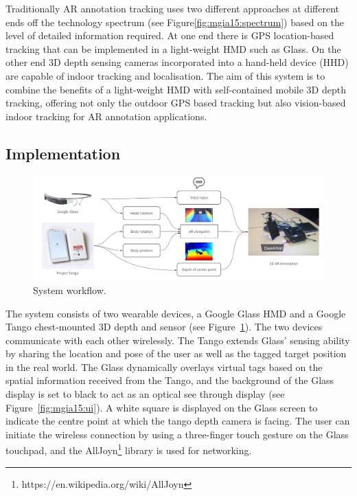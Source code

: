 Traditionally AR annotation tracking uses two different approaches at different ends off the technology spectrum (see Figure\ref{fig:mgia15:spectrum}) based on the level of detailed information required. At one end there is GPS location-based tracking that can be implemented in a light-weight HMD such as Glass. On the other end 3D depth sensing cameras incorporated into a hand-held device (HHD) are capable of indoor tracking and localisation. The aim of this system is to combine the benefits of a light-weight HMD with self-contained mobile 3D depth tracking, offering not only the outdoor GPS based tracking but also vision-based indoor tracking for AR annotation applications. 

\subsection{Implementation}

\begin{figure}
  \centering
  \includegraphics[width=\linewidth]{images/mgia15/mgia2015-system.jpg}
  \caption{System workflow.}
  \label{framework}
\end{figure}

The system consists of two wearable devices, a Google Glass HMD and a Google Tango chest-mounted 3D depth and sensor (see Figure~\ref{framework}). The two devices communicate with each other wirelessly. The Tango extends Glass' sensing ability by sharing the location and pose of the user as well as the tagged target position in the real world. The Glass dynamically overlays virtual tags based on the spatial information received from the Tango, and the background of the Glass display is set to black to act as an optical see through display (see Figure~\ref{fig:mgia15:ui}). A white square is displayed on the Glass screen to indicate the centre point at which the tango depth camera is facing. The user can initiate the wireless connection by using a three-finger touch gesture on the Glass touchpad, and the AllJoyn\footnote{https://en.wikipedia.org/wiki/AllJoyn} library  is used for networking.

